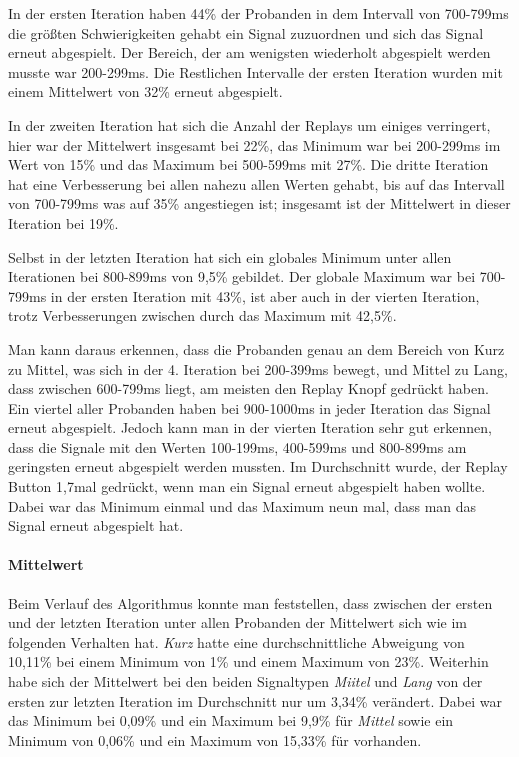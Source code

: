 In der ersten Iteration haben 44\% der Probanden in dem Intervall von 700-799ms die gr{\"o}{\ss}ten Schwierigkeiten gehabt ein Signal zuzuordnen und sich das Signal erneut abgespielt. 
Der Bereich, der am wenigsten wiederholt abgespielt werden musste war 200-299ms. 
Die Restlichen Intervalle der ersten Iteration wurden mit einem Mittelwert von 32\% erneut abgespielt.

In der zweiten Iteration hat sich die Anzahl der Replays um einiges verringert, hier war der Mittelwert insgesamt bei 22\%, das Minimum war bei 200-299ms im Wert von 15\% und das Maximum bei 500-599ms mit 27\%.  
Die dritte Iteration hat eine Verbesserung bei allen nahezu allen Werten gehabt, bis auf das Intervall von 700-799ms was auf 35\% angestiegen ist; insgesamt ist der Mittelwert in dieser Iteration bei 19\%. 

Selbst in der letzten Iteration hat sich ein globales Minimum unter allen Iterationen bei 800-899ms von 9,5\% gebildet. Der globale Maximum war bei 700-799ms in der ersten Iteration mit 43\%, ist aber auch in der vierten Iteration, trotz Verbesserungen zwischen durch das Maximum mit 42,5\%. 

Man kann daraus erkennen, dass die Probanden genau an dem Bereich von Kurz zu Mittel, was sich in der 4. Iteration bei 200-399ms bewegt, und Mittel zu Lang, dass zwischen 600-799ms liegt, am meisten den Replay Knopf gedr{\"u}ckt haben. 
Ein viertel aller Probanden haben bei 900-1000ms in jeder Iteration das Signal erneut abgespielt. 
Jedoch kann man in der vierten Iteration sehr gut erkennen, dass die Signale mit den Werten 100-199ms, 400-599ms und 800-899ms am geringsten erneut abgespielt werden mussten.
Im Durchschnitt wurde, der Replay Button 1,7mal gedr{\"u}ckt, wenn man ein Signal erneut abgespielt haben wollte. 
Dabei war das Minimum einmal und das Maximum neun mal, dass man das Signal erneut abgespielt hat.

\paragraph{Mittelwert}
Beim Verlauf des Algorithmus konnte man feststellen, dass zwischen der ersten und der letzten Iteration unter allen Probanden der Mittelwert sich wie im folgenden Verhalten hat. 
\textit{Kurz} hatte eine durchschnittliche Abweigung von 10,11\% bei einem Minimum von 1\% und einem Maximum von 23\%. 
Weiterhin habe sich der Mittelwert bei den beiden Signaltypen \textit{Miitel} und \textit{Lang} von der ersten zur letzten Iteration im Durchschnitt nur um 3,34\% verändert.
Dabei war das Minimum bei 0,09\% und ein Maximum bei 9,9\% für \textit{Mittel} sowie ein Minimum von 0,06\% und ein Maximum von 15,33\% für  vorhanden.

